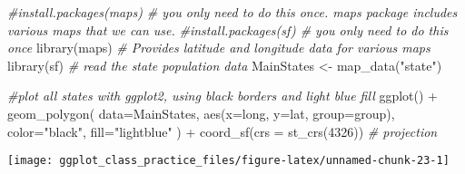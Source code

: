 \documentclass[
]{article}
\newenvironment{Shaded}{\begin{snugshade}}{\end{snugshade}}
\newcommand{\AttributeTok}[1]{\textcolor[rgb]{0.77,0.63,0.00}{#1}}
\newcommand{\CommentTok}[1]{\textcolor[rgb]{0.56,0.35,0.01}{\textit{#1}}}
\newcommand{\DecValTok}[1]{\textcolor[rgb]{0.00,0.00,0.81}{#1}}
\newcommand{\FunctionTok}[1]{\textcolor[rgb]{0.00,0.00,0.00}{#1}}
\newcommand{\NormalTok}[1]{#1}
\newcommand{\OtherTok}[1]{\textcolor[rgb]{0.56,0.35,0.01}{#1}}
\newcommand{\SpecialCharTok}[1]{\textcolor[rgb]{0.00,0.00,0.00}{#1}}
\newcommand{\StringTok}[1]{\textcolor[rgb]{0.31,0.60,0.02}{#1}}
\begin{document}
\begin{Shaded}
\begin{Highlighting}[]
\CommentTok{\#install.packages(\textquotesingle{}maps\textquotesingle{}) \# you only need to do this once. maps package includes various maps that we can use.}
\CommentTok{\#install.packages(\textquotesingle{}sf\textquotesingle{}) \# you only need to do this once}
\FunctionTok{library}\NormalTok{(maps)     }\CommentTok{\# Provides latitude and longitude data for various maps}
\FunctionTok{library}\NormalTok{(sf)}
\CommentTok{\# read the state population data}
\NormalTok{MainStates }\OtherTok{\textless{}{-}} \FunctionTok{map\_data}\NormalTok{(}\StringTok{"state"}\NormalTok{)}

\CommentTok{\#plot all states with ggplot2, using black borders and light blue fill}
\FunctionTok{ggplot}\NormalTok{() }\SpecialCharTok{+} 
  \FunctionTok{geom\_polygon}\NormalTok{( }\AttributeTok{data=}\NormalTok{MainStates, }\FunctionTok{aes}\NormalTok{(}\AttributeTok{x=}\NormalTok{long, }\AttributeTok{y=}\NormalTok{lat, }\AttributeTok{group=}\NormalTok{group),}
                \AttributeTok{color=}\StringTok{"black"}\NormalTok{, }\AttributeTok{fill=}\StringTok{"lightblue"}\NormalTok{ ) }\SpecialCharTok{+}
                \FunctionTok{coord\_sf}\NormalTok{(}\AttributeTok{crs =} \FunctionTok{st\_crs}\NormalTok{(}\DecValTok{4326}\NormalTok{)) }\CommentTok{\# projection}
\end{Highlighting}
\end{Shaded}

\begin{center}\texttt{[image: ggplot\_class\_practice\_files/figure-latex/unnamed-chunk-23-1]} \end{center}
\end{document}
